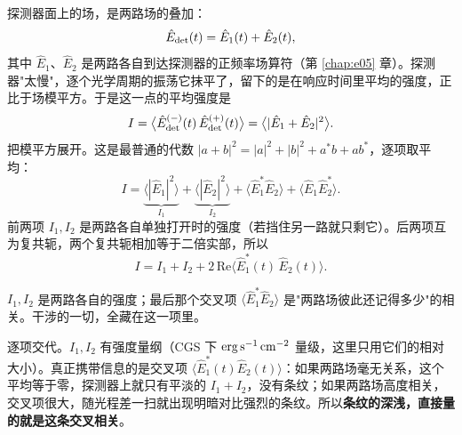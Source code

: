 探测器面上的场，是两路场的叠加：
\[
  \hat E_{\rm det}(t)=\hat E_1(t)+\hat E_2(t),
\]
其中 \(\hat E_1\)、\(\hat E_2\) 是两路各自到达探测器的正频率场算符（第 \ref{chap:e05} 章）。探测器"太慢"，逐个光学周期的振荡它抹平了，留下的是在响应时间里平均的强度，正比于场模平方。于是这一点的平均强度是
\[
  I=\big\langle \hat E_{\rm det}^{(-)}(t)\,\hat E_{\rm det}^{(+)}(t)\big\rangle
   =\big\langle |\hat E_1+\hat E_2|^2\big\rangle .
\]
把模平方展开。这是最普通的代数 \(|a+b|^2=|a|^2+|b|^2+a^\ast b+ab^\ast\)，逐项取平均：
\[
  I=\underbrace{\big\langle|\hat E_1|^2\big\rangle}_{I_1}
   +\underbrace{\big\langle|\hat E_2|^2\big\rangle}_{I_2}
   +\big\langle \hat E_1^\ast \hat E_2\big\rangle
   +\big\langle \hat E_1 \hat E_2^\ast\big\rangle .
\]
前两项 \(I_1,I_2\) 是两路各自单独打开时的强度（若挡住另一路就只剩它）。后两项互为复共轭，两个复共轭相加等于二倍实部，所以
\begin{equation}
  I=I_1+I_2+2\,\mathrm{Re}\big\langle \hat E_1^\ast(t)\,\hat E_2(t)\big\rangle .
  \label{eq:e09-interference-raw}
\end{equation}
\begin{formulaexplain}
\(I_1,I_2\) 是两路各自的强度；最后那个交叉项 \(\langle\hat E_1^\ast\hat E_2\rangle\) 是"两路场彼此还记得多少"的相关。干涉的一切，全藏在这一项里。
\end{formulaexplain}

逐项交代。\(I_1,I_2\) 有强度量纲（CGS 下 \({\rm erg\,s^{-1}\,cm^{-2}}\) 量级，这里只用它们的相对大小）。真正携带信息的是交叉项 \(\langle\hat E_1^\ast(t)\hat E_2(t)\rangle\)：如果两路场毫无关系，这个平均等于零，探测器上就只有平淡的 \(I_1+I_2\)，没有条纹；如果两路场高度相关，交叉项很大，随光程差一扫就出现明暗对比强烈的条纹。所以\textbf{条纹的深浅，直接量的就是这条交叉相关}。

